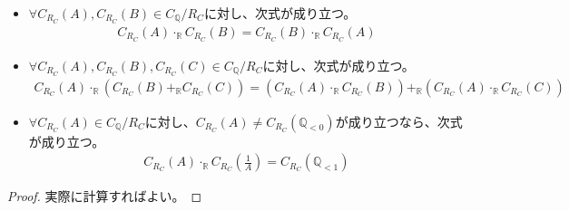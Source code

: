 \documentclass[dvipdfmx]{jsarticle}
\begin{document}
\begin{thm}
\begin{itemize}
\item
  $\forall C_{R_{C}}(A),C_{R_{C}}(B) \in C_{\mathbb{Q}} /R_{C} $に対し、次式が成り立つ。
\begin{align*}
C_{R_{C}}(A) \cdot_{\mathbb{R}}C_{R_{C}}(B) = C_{R_{C}}(B) \cdot_{\mathbb{R}}C_{R_{C}}(A)
\end{align*}
\item
  $\forall C_{R_{C}}(A),C_{R_{C}}(B),C_{R_{C}}(C) \in C_{\mathbb{Q}} /R_{C} $に対し、次式が成り立つ。
\begin{align*}
C_{R_{C}}(A) \cdot_{\mathbb{R}}\left( C_{R_{C}}(B) +_{\mathbb{R}}C_{R_{C}}(C) \right) = \left( C_{R_{C}}(A) \cdot_{\mathbb{R}}C_{R_{C}}(B) \right) +_{\mathbb{R}}\left( C_{R_{C}}(A) \cdot_{\mathbb{R}}C_{R_{C}}(C) \right)
\end{align*}
\item
  $\forall C_{R_{C}}(A) \in C_{\mathbb{Q}} /R_{C} $に対し、$C_{R_{C}}(A) \neq C_{R_{C}}\left( \mathbb{Q}_{< 0} \right)$が成り立つなら、次式が成り立つ。
\begin{align*}
C_{R_{C}}(A) \cdot_{\mathbb{R}}C_{R_{C}}\left( \frac{1}{A} \right) = C_{R_{C}}\left( \mathbb{Q}_{< 1} \right)
\end{align*}
\end{itemize}
\end{thm}
\begin{proof}
実際に計算すればよい。
\end{proof}
\end{document}
